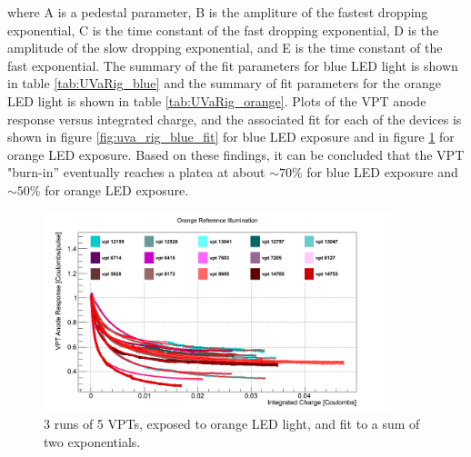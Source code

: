 \noindent where A is a pedestal parameter, B is the ampliture of the
fastest dropping exponential, C is the time constant of the fast
dropping exponential, D is the amplitude of the slow dropping
exponential, and E is the time constant of the fast exponential.  The
summary of the fit parameters for blue LED light is shown in table
\ref{tab:UVaRig_blue} and the summary of fit parameters for the orange
LED light is shown in table \ref{tab:UVaRig_orange}.  Plots of the VPT
anode response versus integrated charge, and the associated fit for
each of the devices is shown in figure \ref{fig:uva_rig_blue_fit} for
blue LED exposure and in figure \ref{fig:uva_rig_orange_fit} for
orange LED exposure.  Based on these findings, it can be concluded
that the VPT "burn-in'' eventually reaches a platea at about
$\sim70\%$ for blue LED exposure and $\sim50\%$ for orange LED
exposure.  

\begin{figure}[h]
   \centering
  \includegraphics[width=0.9\textwidth]{Figures/CMS_Diagrams/UVaRig__all_good_runs_Overlay___orange_reference_anode__vs__integrated_charge__rolling_average_of_10pts__normalized_to_start_of_run__fitted_with_Double_Exponential.png}
  \caption{3 runs of 5 VPTs, exposed to orange LED light, and fit to a
    sum of two exponentials. } \label{fig:uva_rig_orange_fit}
\end{figure}

